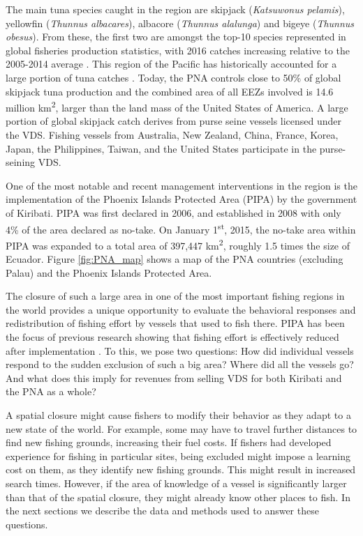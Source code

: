 \documentclass[9pt,twoside,lineno]{pnas-new}
\begin{document}
The main tuna species caught in the region are skipjack
(\emph{Katsuwonus pelamis}), yellowfin (\emph{Thunnus albacares}),
albacore (\emph{Thunnus alalunga}) and bigeye (\emph{Thunnus obesus}).
From these, the first two are amongst the top-10 species represented in
global fisheries production statistics, with 2016 catches increasing
relative to the 2005-2014 average \citep{fao_2018}. This region of the
Pacific has historically accounted for a large portion of tuna catches
\cite{aqorau_1997}. Today, the PNA controls close to 50\% of global
skipjack tuna production \cite{pna_website_2018} and the combined area of all EEZs involved is 14.6 million km\textsuperscript{2}, larger than the land mass of the United States of America. A large portion of global skipjack
catch derives from purse seine vessels licensed under the VDS.
Fishing vessels from Australia, New Zealand, China, France, Korea,
Japan, the Philippines, Taiwan, and the United States participate in the
purse-seining VDS.

One of the most notable and recent management interventions in the
region is the implementation of the Phoenix Islands Protected Area (PIPA)
by the government of Kiribati. PIPA was first declared in 2006, and
established in 2008 with only 4\% of the area declared as no-take. On
January 1\textsuperscript{st}, 2015, the no-take area within PIPA was
expanded to a total area of 397,447 km\textsuperscript{2}, roughly 1.5
times the size of Ecuador. Figure \ref{fig:PNA_map} shows a map of the
PNA countries (excluding Palau) and the Phoenix Islands Protected Area.

The closure of such a large area in one of the most important fishing
regions in the world provides a unique opportunity to evaluate the
behavioral responses and redistribution of fishing effort by vessels
that used to fish there. PIPA has been the focus of previous research
showing that fishing effort is effectively reduced after implementation
\citep{mccauley_2016,mcdermott_2018}. To this, we pose two questions:
How did individual vessels respond to the sudden exclusion of such a big
area? Where did all the vessels go? And what does this imply for revenues from
selling VDS for both Kiribati and the PNA as a whole? 

A spatial closure might cause fishers to modify
their behavior as they adapt to a new state of the world. For example, some may have
to travel further distances to find new fishing grounds, increasing their fuel
costs. If fishers had developed experience for fishing in particular
sites, being excluded might impose a learning cost on them, as they
identify new fishing grounds. This might result in increased search
times. However, if the area of knowledge of a vessel is significantly
larger than that of the spatial closure, they might already know other
places to fish. In the next sections we describe
the data and methods used to answer these questions.
\end{document}
